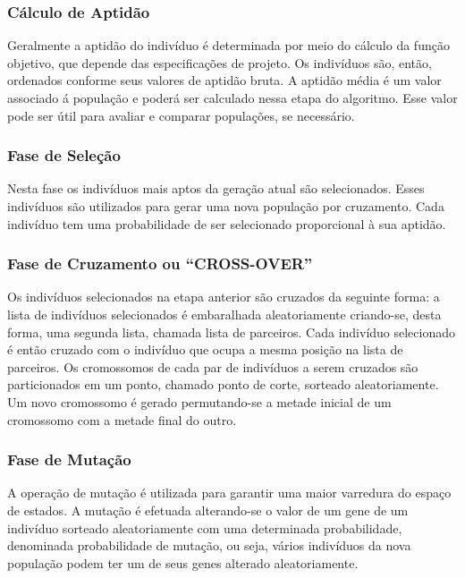 \subsubsection{Cálculo de Aptidão}

Geralmente a aptidão do indivíduo é determinada por meio do cálculo da função objetivo, que depende das especificações de projeto. Os indivíduos são, então, ordenados conforme seus valores de aptidão bruta. A aptidão média é um valor associado á população e poderá ser calculado nessa etapa do algoritmo. Esse valor pode ser útil para avaliar e comparar populações, se necessário.

\subsubsection{Fase de Seleção}

Nesta fase os indivíduos mais aptos da geração atual são selecionados. Esses indivíduos são utilizados para gerar uma nova população por cruzamento. Cada indivíduo tem uma probabilidade de ser selecionado proporcional à sua aptidão. 

\subsubsection{Fase de Cruzamento ou ``CROSS-OVER''} 

Os indivíduos selecionados na etapa anterior são cruzados da seguinte forma: a lista de indivíduos selecionados é embaralhada aleatoriamente criando-se, desta forma, uma segunda lista, chamada lista de parceiros. Cada indivíduo selecionado é então cruzado com o indivíduo que ocupa a mesma posição na lista de parceiros. Os cromossomos de cada par de indivíduos a serem cruzados são particionados em um ponto, chamado ponto de corte, sorteado aleatoriamente. Um novo cromossomo é gerado permutando-se a metade inicial de um cromossomo com a metade final do outro. 

\subsubsection{Fase de Mutação}

A operação de mutação é utilizada para garantir uma maior varredura do espaço de estados. A  mutação é efetuada alterando-se o valor de um gene de um indivíduo sorteado aleatoriamente com uma determinada probabilidade, denominada probabilidade de mutação, ou seja, vários indivíduos da nova população podem ter um de seus genes alterado aleatoriamente. 

